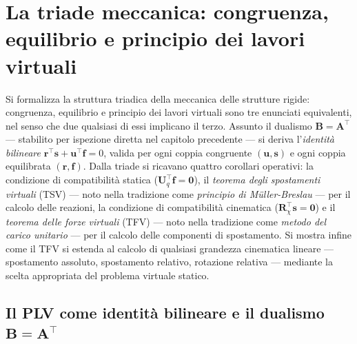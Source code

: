 \graphicspath{{Parti/P03-Meccanica_SR/C11-TLV/Figure/}}
\chapter{La triade meccanica: congruenza, equilibrio e principio dei lavori virtuali  }\label{cap:TLV}


\begin{sommario}
	Si formalizza la struttura triadica della meccanica
	delle strutture rigide: congruenza, equilibrio e
	principio dei lavori virtuali sono tre enunciati
	equivalenti, nel senso che due qualsiasi di essi
	implicano il terzo. Assunto il dualismo
	$\bm{B} = \bm{A}^{\top}$ --- stabilito per ispezione
	diretta nel capitolo precedente --- si deriva
	l'\emph{identità bilineare}
	$\bm{r}^{\top}\bm{s} + \bm{u}^{\top}\bm{f} = 0$,
	valida per ogni coppia congruente $(\bm{u}, \bm{s})$
	e ogni coppia equilibrata $(\bm{r}, \bm{f})$.
	Dalla triade si ricavano quattro corollari operativi:
	la condizione di compatibilità statica
	($\bm{U}_q^{\top}\bm{f} = \bm{0}$), il \emph{teorema
		degli spostamenti virtuali} (TSV) --- noto nella
	tradizione come \emph{principio di Müller-Breslau}
	--- per il calcolo delle reazioni, la condizione di
	compatibilità cinematica
	($\bm{R}_\chi^{\top}\bm{s} = \bm{0}$) e il
	\emph{teorema delle forze virtuali} (TFV) --- noto
	nella tradizione come \emph{metodo del carico unitario}
	--- per il calcolo delle componenti di spostamento.
	Si mostra infine come il TFV si estenda al calcolo di
	qualsiasi grandezza cinematica lineare --- spostamento
	assoluto, spostamento relativo, rotazione relativa ---
	mediante la scelta appropriata del problema virtuale
	statico.
\end{sommario}




\section{Il PLV come identità bilineare e il dualismo \texorpdfstring{$\bm{B} = \bm{A}^{\top}$}{B = A\textasciicircum T}}
\label{sec:dualismo}

